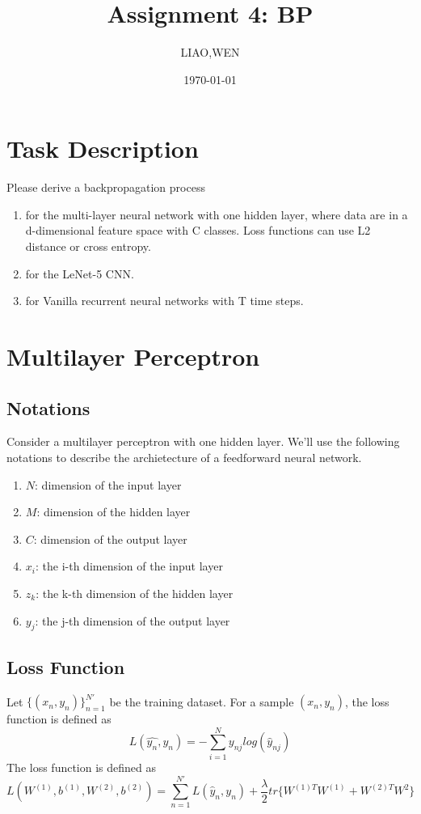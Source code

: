 \documentclass[11pt,a4paper]{article}
\begin{document}
\title{Assignment 4: BP}
\author{LIAO,WEN}
\date{\today}
\maketitle
\section{Task Description}
Please derive a backpropagation process
\begin{enumerate}
\item for the multi-layer neural network with one hidden layer, where data are in a d-dimensional feature space with C classes. Loss functions can use L2 distance or cross entropy. 
\item for the LeNet-5 CNN.
\item for Vanilla recurrent neural networks with T time steps.
\end{enumerate}  
\section{Multilayer Perceptron}
\subsection{Notations}
Consider a multilayer perceptron with one hidden layer. We'll use the following notations to describe the archietecture of a feedforward neural network.
\begin{enumerate}
\item$N$: dimension of the input layer
\item$M$: dimension of the hidden layer
\item$C$: dimension of the output layer
\item$x_{i}$: the i-th dimension of the input layer 
\item$z_{k}$: the k-th dimension of the hidden layer
\item$y_{j}$: the j-th dimension of the output layer
\end{enumerate}
\subsection{Loss Function}
Let $\{(x_{n},y_{n})\}^{N'}_{n=1}$ be the training dataset. For a sample $(x_{n},y_{n})$, the loss function is defined as
\begin{displaymath}
L(\hat{y_{n}},y_{n})=-\sum^{N}_{i=1}y_{nj}log(\hat{y}_{nj})
\end{displaymath}
The loss function is defined as
\begin{displaymath}
L(W^{(1)},b^{(1)},W^{(2)},b^{(2)}) = \sum^{N'}_{n = 1}L(\hat{y}_{n},y_{n})+\frac{\lambda}{2}tr\{W^{(1)T}W^{(1)}+W^{(2)T}W^{2}\}
\end{displaymath}
\end{document}
